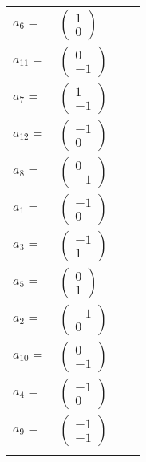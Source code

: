 \documentclass[1p]{elsarticle_modified}
\theoremstyle{definition}
\begin{document}
\begin{tabular}{m{7pt} m{180pt} m{7pt} m{180pt} }
\flushright $a_{6}=$&$\begin{pmatrix}1\\0\end{pmatrix}$ \\
\flushright $a_{11}=$&$\begin{pmatrix}0\\-1\end{pmatrix}$ \\
\flushright $a_{7}=$&$\begin{pmatrix}1\\-1\end{pmatrix}$ \\
\flushright $a_{12}=$&$\begin{pmatrix}-1\\0\end{pmatrix}$ \\
\flushright $a_{8}=$&$\begin{pmatrix}0\\-1\end{pmatrix}$ \\
\flushright $a_{1}=$&$\begin{pmatrix}-1\\0\end{pmatrix}$ \\
\flushright $a_{3}=$&$\begin{pmatrix}-1\\1\end{pmatrix}$ \\
\flushright $a_{5}=$&$\begin{pmatrix}0\\1\end{pmatrix}$ \\
\flushright $a_{2}=$&$\begin{pmatrix}-1\\0\end{pmatrix}$ \\
\flushright $a_{10}=$&$\begin{pmatrix}0\\-1\end{pmatrix}$ \\
\flushright $a_{4}=$&$\begin{pmatrix}-1\\0\end{pmatrix}$ \\
\flushright $a_{9}=$&$\begin{pmatrix}-1\\-1\end{pmatrix}$\\&\end{tabular}
\end{document}
